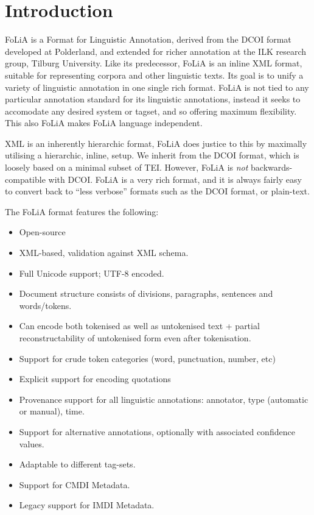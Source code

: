 \section{Introduction}


FoLiA is a Format for Linguistic Annotation, derived from the DCOI\cite{DCOI} format developed at Polderland, and extended for richer annotation at the ILK research group, Tilburg University. Like its predecessor, FoLiA is an inline XML format, suitable for representing corpora and other linguistic texts. Its goal is to unify a variety of linguistic annotation in one single rich format. FoLiA is not tied to any particular annotation standard for its linguistic annotations, instead it seeks to accomodate any desired system or tagset, and so offering maximum flexibility. This also FoLiA makes FoLiA language independent.

XML is an inherently hierarchic format, FoLiA does justice to this by maximally utilising a hierarchic, inline, setup. We inherit from the DCOI format, which is loosely based on a minimal subset of TEI. However, FoLiA is \emph{not} backwards-compatible with DCOI. FoLiA is a very rich format, and it is always fairly easy to convert back to ``less verbose'' formats such as the DCOI format, or plain-text. 

The FoLiA format features the following:

\begin{itemize}
\item Open-source
\item XML-based, validation against XML schema.
\item Full Unicode support; UTF-8 encoded.
\item Document structure consists of divisions, paragraphs, sentences and words/tokens.
\item Can encode both tokenised as well as untokenised text + partial reconstructability of untokenised form even after tokenisation.
\item Support for crude token categories (word, punctuation, number, etc)
\item Explicit support for encoding quotations
\item Provenance support for all linguistic annotations: annotator, type (automatic or manual), time.
\item Support for alternative annotations, optionally with associated confidence values.
\item Adaptable to different tag-sets.
\item Support for CMDI Metadata.
\item Legacy support for IMDI Metadata.
\end{itemize}

